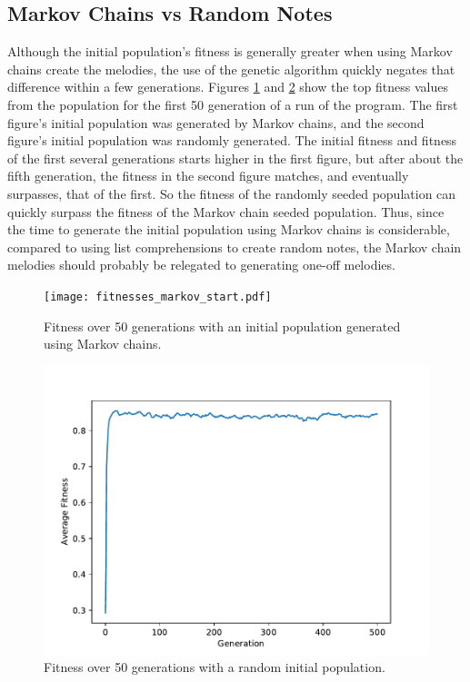 \subsection{Markov Chains vs Random Notes}
Although the initial population's fitness is generally greater when using Markov chains create the melodies, the use of the genetic algorithm quickly negates that difference within a few generations.
Figures \ref{fig:fitness_markov} and \ref{fig:fitness:random} show the top fitness values from the population for the first 50 generation of a run of the program.
The first figure's initial population was generated by Markov chains, and the second figure's initial population was randomly generated.
The initial fitness and fitness of the first several generations starts higher in the first figure, but after about the fifth generation, the fitness in the second figure matches, and eventually surpasses, that of the first.
So the fitness of the randomly seeded population can quickly surpass the fitness of the Markov chain seeded population.
Thus, since the time to generate the initial population using Markov chains is considerable, compared to using list comprehensions to create random notes, the Markov chain melodies should probably be relegated to generating one-off melodies.

\begin{figure}[h]
	\centering
	\texttt{[image: fitnesses\_markov\_start.pdf]}
	\caption{Fitness over 50 generations with an initial population generated using Markov chains.}
	\label{fig:fitness_markov}
\end{figure}

\begin{figure}[h]
	\centering
	\includegraphics[width=\linewidth]{figures/fitnesses_random_start.pdf}
	\caption{Fitness over 50 generations with a random initial population.}
	\label{fig:fitness:random}
\end{figure}

